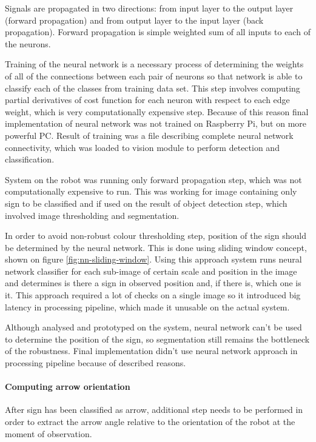 Signals are propagated in two directions: from input layer to the output layer (forward propagation) and from output layer to the input layer (back propagation). Forward propagation is simple weighted sum of all inputs to each of the neurons.

Training of the neural network is a necessary process of determining the weights of all of the connections between each pair of neurons so that network is able to classify each of the classes from training data set. This step involves computing partial derivatives of cost function for each neuron with respect to each edge weight, which is very computationally expensive step. Because of this reason final implementation of neural network was not trained on Raspberry Pi, but on more powerful PC. Result of training was a file describing complete neural network connectivity, which was loaded to vision module to perform detection and classification. 

System on the robot was running only forward propagation step, which was not computationally expensive to run. This was working for image containing only sign to be classified and if used on the result of object detection step, which involved image thresholding and segmentation.

In order to avoid non-robust colour thresholding step, position of the sign should be determined by the neural network. This is done using sliding window concept, shown on figure \ref{fig:nn-sliding-window}. Using this approach system runs neural network classifier for each sub-image of certain scale and position in the image and determines is there a sign in observed position and, if there is, which one is it. This approach required a lot of checks on a single image so it introduced big latency in processing pipeline, which made it unusable on the actual system. 

Although analysed and prototyped on the system, neural network can't be used to determine the position of the sign, so segmentation still remains the bottleneck of the robustness. Final implementation didn't use neural network approach in processing pipeline because of described reasons.

\paragraph{Computing arrow orientation}

After sign has been classified as arrow, additional step needs to be performed in order to extract the arrow angle relative to the orientation of the robot at the moment of observation.

